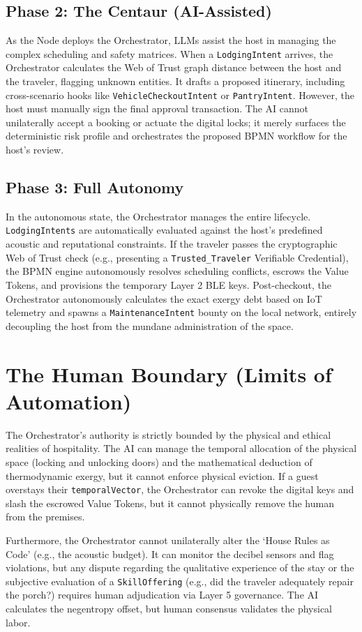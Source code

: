 \subsection{Phase 2: The Centaur (AI-Assisted)}
As the Node deploys the Orchestrator, LLMs assist the host in managing the complex scheduling and safety matrices. When a \texttt{LodgingIntent} arrives, the Orchestrator calculates the Web of Trust graph distance between the host and the traveler, flagging unknown entities. It drafts a proposed itinerary, including cross-scenario hooks like \texttt{VehicleCheckoutIntent} or \texttt{PantryIntent}. However, the host must manually sign the final approval transaction. The AI cannot unilaterally accept a booking or actuate the digital locks; it merely surfaces the deterministic risk profile and orchestrates the proposed BPMN workflow for the host's review.

\subsection{Phase 3: Full Autonomy}
In the autonomous state, the Orchestrator manages the entire lifecycle. \texttt{LodgingIntents} are automatically evaluated against the host's predefined acoustic and reputational constraints. If the traveler passes the cryptographic Web of Trust check (e.g., presenting a \texttt{Trusted\_Traveler} Verifiable Credential), the BPMN engine autonomously resolves scheduling conflicts, escrows the Value Tokens, and provisions the temporary Layer 2 BLE keys. Post-checkout, the Orchestrator autonomously calculates the exact exergy debt based on IoT telemetry and spawns a \texttt{MaintenanceIntent} bounty on the local network, entirely decoupling the host from the mundane administration of the space.

\section{The Human Boundary (Limits of Automation)}
The Orchestrator's authority is strictly bounded by the physical and ethical realities of hospitality. The AI can manage the temporal allocation of the physical space (locking and unlocking doors) and the mathematical deduction of thermodynamic exergy, but it cannot enforce physical eviction. If a guest overstays their \texttt{temporalVector}, the Orchestrator can revoke the digital keys and slash the escrowed Value Tokens, but it cannot physically remove the human from the premises. 

Furthermore, the Orchestrator cannot unilaterally alter the `House Rules as Code' (e.g., the acoustic budget). It can monitor the decibel sensors and flag violations, but any dispute regarding the qualitative experience of the stay or the subjective evaluation of a \texttt{SkillOffering} (e.g., did the traveler adequately repair the porch?) requires human adjudication via Layer 5 governance. The AI calculates the negentropy offset, but human consensus validates the physical labor.

